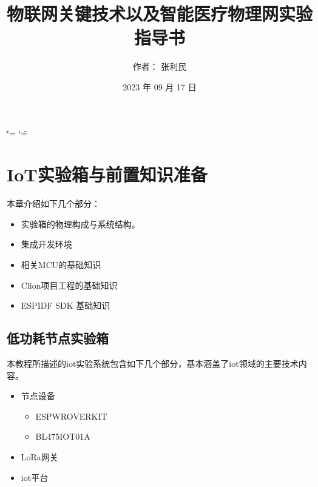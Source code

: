 \documentclass[a4paper,12pt,english]{sphinxmanual}
\title{物联网关键技术以及智能医疗物理网实验指导书}
\date{2023 年 09 月 17 日}
\author{作者： 张利民}
\begin{document}
\ifdefined\shorthandoff
  \ifnum\catcode`\=\string=\active\shorthandoff{=}\fi
  \ifnum\catcode`\"=\active{}\fi
\fi

\pagestyle{empty}
\sphinxmaketitle
\pagestyle{plain}
\sphinxtableofcontents
\pagestyle{normal}
\label{\detokenize{index::doc}}


\sphinxstepscope


\chapter{IoT实验箱与前置知识准备}
\label{\detokenize{dev-board/index:iot}}\label{\detokenize{dev-board/index::doc}}
\sphinxAtStartPar
本章介绍如下几个部分：
\begin{itemize}
\item {} 
\sphinxAtStartPar
实验箱的物理构成与系统结构。

\item {} 
\sphinxAtStartPar
集成开发环境

\item {} 
\sphinxAtStartPar
相关MCU的基础知识

\item {} 
\sphinxAtStartPar
Clion项目工程的基础知识

\item {} 
\sphinxAtStartPar
ESP\sphinxhyphen{}IDF SDK 基础知识

\end{itemize}

\sphinxstepscope


\section{低功耗节点实验箱}
\label{\detokenize{dev-board/arch:id1}}\label{\detokenize{dev-board/arch::doc}}
\sphinxAtStartPar
本教程所描述的iot实验系统包含如下几个部分，基本涵盖了iot领域的主要技术内容。
\begin{itemize}
\item {} 
\sphinxAtStartPar
节点设备
\begin{itemize}
\item {} 
\sphinxAtStartPar
ESP\sphinxhyphen{}WROVER\sphinxhyphen{}KIT

\item {} 
\sphinxAtStartPar
B\sphinxhyphen{}L475\sphinxhyphen{}IOT01A

\end{itemize}

\item {} 
\sphinxAtStartPar
LoRa网关

\item {} 
\sphinxAtStartPar
iot平台

\end{itemize}
\end{document}
